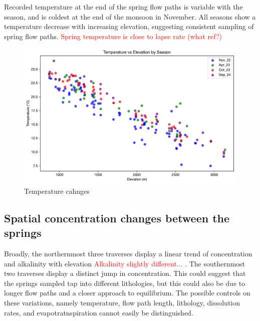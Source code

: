 \FloatBarrier

\bsk

Recorded temperature at the end of the spring flow paths is variable with the season, and is coldest at the end of the monsoon in November. All seasons show a temperature decrease with increasing elevation, suggesting consistent sampling of spring flow paths. 
\textcolor{red}{Spring temperature is close to lapse rate (what ref?)} 


\begin{figure}[h]
    \centering
    \includegraphics[width=\textwidth]{Temperature_Elevation_Season.pdf}
    \caption{Temperature cahnges}
    \label{fig:seasonal_change2}
\end{figure}

\FloatBarrier

\newpage


\subsection{Spatial concentration changes between the springs}

Broadly, the northernmost three traverses display a linear trend of concentration and alkalinity with elevation \textcolor{red}{Alkalinity slightly different...} . The southernmost two traverses display a distinct jump in concentration. This could suggest that the springs sampled tap into different lithologies, but this could also be due to longer flow paths and a closer approach to equilibrium. The possible controls on these variations, namely temperature, flow path length, lithology, dissolution rates, and evapotratnspiration cannot easily be distinguished.

